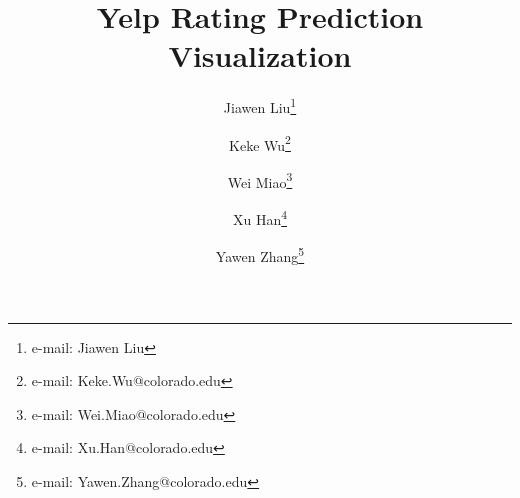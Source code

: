 \documentclass{vgtc}
\theoremstyle{definition}
\begin{document}
\title{Yelp Rating Prediction Visualization}

\author{Jiawen Liu\thanks{e-mail: Jiawen Liu}\\ %
	\and Keke Wu\thanks{e-mail: Keke.Wu@colorado.edu}\\ %
	\and Wei Miao\thanks{e-mail: Wei.Miao@colorado.edu}\\ %
	\and Xu Han\thanks{e-mail: Xu.Han@colorado.edu}\\ %
	\and Yawen Zhang\thanks{e-mail: Yawen.Zhang@colorado.edu}\\ %
	}

%
%
%
%


% 


\maketitle









 
\end{document}
